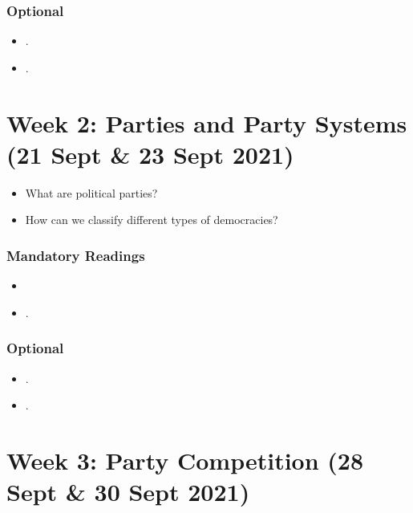 \documentclass[abstract=on,parskip=full,headings=standardclasses,fontsize=11pt,paper=a4]{scrartcl}
\begin{document}
\subsubsection*{Optional}
\begin{itemize}
\item {}.
\item {}.
\end{itemize}



\section{Week 2: Parties and Party Systems (21 Sept \& 23 Sept 2021)}





\begin{itemize}
\renewcommand\labelitemi{--}
\item  What are political parties?
\item How can we classify different types of democracies?
\end{itemize}

\subsubsection*{Mandatory Readings}
\begin{itemize}
\item {}
\item {}.
\end{itemize}




\subsubsection*{Optional}
\begin{itemize}
\item {}.
\item {}.
\end{itemize}


\section{Week 3:  Party Competition  (28 Sept \& 30 Sept 2021)}
\end{document}
